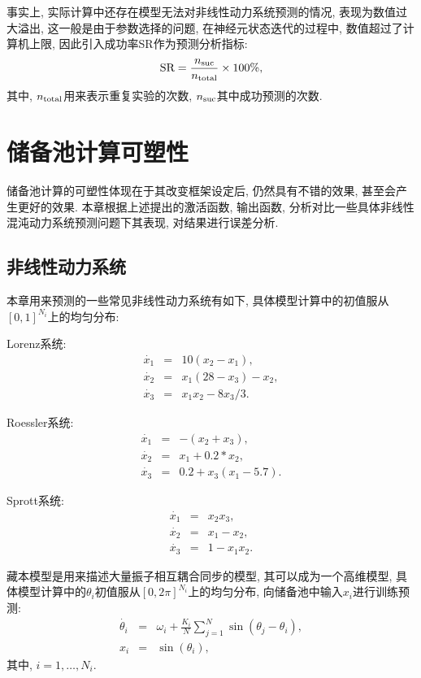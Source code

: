 \documentclass[notitlepage,cs4size,punct,oneside]{ctexrep}
\numberwithin{equation}{chapter}
\theoremstyle{mystyle}
\begin{document}
事实上, 实际计算中还存在模型无法对非线性动力系统预测的情况, 
表现为数值过大溢出, 这一般是由于参数选择的问题, 
在神经元状态迭代的过程中, 数值超过了计算机上限, 因此引入成功率SR作为预测分析指标:
$$
    \textmd{SR} = \frac{n_{\textmd{suc}}}{n_{\textmd{total}}}\times100\%,
$$
其中, $n_{\textmd{total}}$用来表示重复实验的次数, 
$n_{\textmd{suc}}$其中成功预测的次数. 

\chapter{储备池计算可塑性}
储备池计算的可塑性体现在于其改变框架设定后, 仍然具有不错的效果, 甚至会产生更好的效果. 
本章根据上述提出的激活函数, 输出函数, 分析对比一些具体非线性混沌动力系统预测问题下其表现, 
对结果进行误差分析. 

\section{非线性动力系统}

本章用来预测的一些常见非线性动力系统有如下, 具体模型计算中的初值服从$[0, 1]^{N_i}$上的均匀分布:

Lorenz系统:
\begin{eqnarray*}
    \dot{x_1}&=&10(x_2-x_1),\\
    \dot{x_2}&=&x_1(28-x_3)-x_2,\\
    \dot{x_3}&=&x_1x_2-8x_3/3. 
\end{eqnarray*}

Roessler系统:
\begin{eqnarray*}
    \dot{x_1}&=&-(x_2+x_3),\\
    \dot{x_2}&=&x_1 + 0.2*x_2,\\
    \dot{x_3}&=&0.2+x_3(x_1-5.7). 
\end{eqnarray*}

Sprott系统:
\begin{eqnarray*}
    \dot{x_1}&=&x_2x_3,\\
    \dot{x_2}&=&x_1-x_2,\\
    \dot{x_3}&=&1-x_1x_2. 
\end{eqnarray*}

藏本模型是用来描述大量振子相互耦合同步的模型, 其可以成为一个高维模型, 
具体模型计算中的$\theta_i$初值服从$[0, 2\pi]^{N_i}$上的均匀分布, 
向储备池中输入$x_i$进行训练预测:
\begin{eqnarray*}
    \dot{\theta_i}&=&\omega_i+\frac{K_i}{N}\sum_{j=1}^N\sin(\theta_j-\theta_i),  \\
    x_i&=&\sin(\theta_i),
\end{eqnarray*}
其中, $i=1, \dots, N_i$. 
\end{document}
